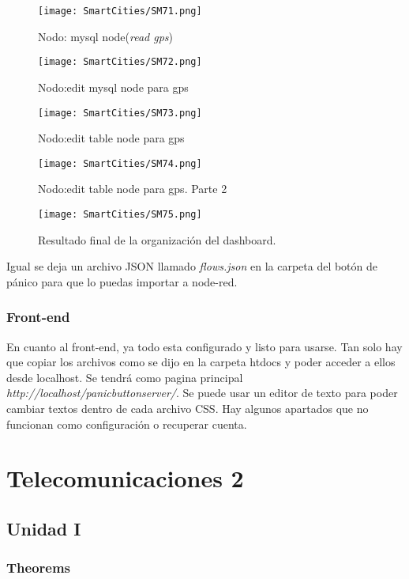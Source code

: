 \documentclass[11pt,fleqn]{book} %
\begin{document}
\begin{figure}[h!]
\centering\texttt{[image: SmartCities/SM71.png]}
\caption{Nodo: mysql node(\textit{read gps})}
\label{fig:nodomysql4}
\end{figure}
\begin{figure}[h!]
\centering\texttt{[image: SmartCities/SM72.png]}
\caption{Nodo:edit mysql node para gps}
\label{fig:nodomysql5}
\end{figure}
\begin{figure}[h!]
\centering\texttt{[image: SmartCities/SM73.png]}
\caption{Nodo:edit table node para gps}
\label{fig:nodotable1}
\end{figure}
\begin{figure}[h!]
\centering\texttt{[image: SmartCities/SM74.png]}
\caption{Nodo:edit table node para gps. Parte 2}
\label{fig:nodotable2}
\end{figure}
\begin{figure}[h!]
\centering\texttt{[image: SmartCities/SM75.png]}
\caption{Resultado final de la organización del dashboard.}
\label{fig:dash}
\end{figure}
Igual se deja un archivo JSON llamado \textit{flows.json} en la carpeta del botón de pánico para que lo puedas importar a node-red.
\newpage
\section{Front-end}
En cuanto al front-end, ya todo esta configurado y listo para usarse. Tan solo hay que copiar los archivos como se dijo en la carpeta htdocs y poder acceder a ellos desde localhost. Se tendrá como pagina principal \textit{http://localhost/panicbuttonserver/}. Se puede usar un editor de texto para poder cambiar textos dentro de cada archivo CSS. Hay algunos apartados que no funcionan como configuración o recuperar cuenta.
\part{Telecomunicaciones 2}

\chapter{Unidad I}

\section{Theorems}
\end{document}
